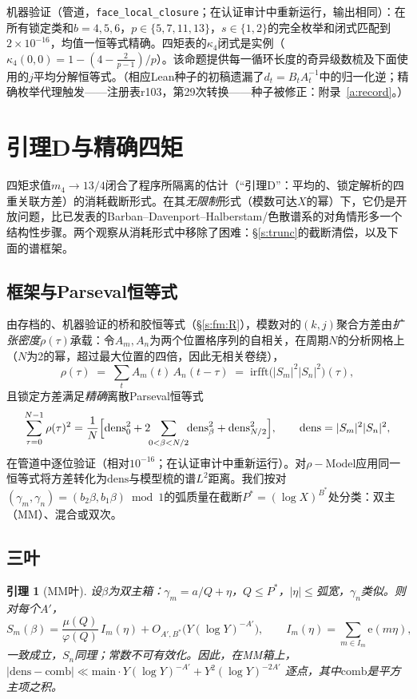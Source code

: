 \documentclass[11pt]{article}
\numberwithin{equation}{section}
\newtheorem{lemma}[theorem]{引理}
\theoremstyle{definition}
\theoremstyle{remark}
\newcommand{\e}{\mathrm{e}}
\begin{document}
机器验证（管道，\texttt{face\_local\_closure}；在认证审计中重新运行，输出相同）：在所有锁定类和$b=4,5,6$，$p\in\{5,7,11,13\}$，$s\in\{1,2\}$的完全枚举和闭式匹配到$2\times10^{-16}$，均值一恒等式精确。四矩表的$\kappa_4$闭式是实例（$\kappa_4(0,0)=1-(4-\tfrac2{p-1})/p$）。该命题提供每一循环长度的奇异级数梳及下面使用的$j$平均分解恒等式。（相应Lean种子的初稿遗漏了$d_t=B_tA_t^{-1}$中的归一化逆；精确枚举代理触发——注册表r103，第29次转换——种子被修正：附录~\ref{a:record}。）

\section{引理D与精确四矩}\label{s:four}

四矩求值$m_4\to13/4$闭合了程序所隔离的估计（“引理D”：平均的、锁定解析的四重关联方差）的消耗截断形式。在其\emph{无限制}形式（模数可达$X$的幂）下，它仍是开放问题，比已发表的Barban--Davenport--Halberstam/色散谱系的对角情形多一个结构性步骤。两个观察从消耗形式中移除了困难：\S\ref{s:trunc}的截断清偿，以及下面的谱框架。

\subsection{框架与Parseval恒等式}

由存档的、机器验证的桥和胶恒等式（\S\ref{s:fm:R}），模数对的$(k,j)$聚合方差由\emph{扩张密度}$\rho(\tau)$承载：令$A_m,A_n$为两个位置格序列的自相关，在周期$N$的分析网格上（$N$为2的幂，超过最大位置的四倍，因此无相关卷绕），
\[
\rho(\tau)\;=\;\sum_{t}A_m(t)\,A_n(t-\tau)
\;=\;\mathrm{irfft}\bigl(|S_m|^{2}|S_n|^{2}\bigr)(\tau),
\]
且锁定方差满足\emph{精确}离散Parseval恒等式
\begin{equation}\label{e:pars}
\sum_{\tau=0}^{N-1}\rho(\tau)^{2}
=\frac1N\Bigl[\mathrm{dens}_0^{2}
+2\!\!\sum_{0<\beta<N/2}\!\!\mathrm{dens}_\beta^{2}
+\mathrm{dens}_{N/2}^{2}\Bigr],
\qquad \mathrm{dens}=|S_m|^{2}|S_n|^{2},
\end{equation}
在管道中逐位验证（相对$10^{-16}$；在认证审计中重新运行）。对$\rho-\mathrm{Model}$应用同一恒等式将方差转化为$\mathrm{dens}$与模型梳的谱$L^2$距离。我们按对$(\gamma_m,\gamma_n)=(b_2\beta,b_1\beta)\bmod1$的弧质量在截断$P^{*}=(\log X)^{B^{*}}$处分类：双主（MM）、混合或双次。

\subsection{三叶}

\begin{lemma}[MM叶]\label{l:MM}
设$\beta$为双主箱：$\gamma_m=a/Q+\eta$，$Q\le P^{*}$，$|\eta|\le$弧宽，$\gamma_n$类似。则对每个$A'$，
\[
S_m(\beta)=\frac{\mu(Q)}{\varphi(Q)}\,I_m(\eta)
+O_{A',B^{*}}\!\bigl(Y(\log Y)^{-A'}\bigr),
\qquad
I_m(\eta)=\sum_{m\in I_m}\e(m\eta),
\]
一致成立，$S_n$同理；常数不可有效化。因此，在MM箱上，
$\bigl|\mathrm{dens}-\mathrm{comb}\bigr|
\ll\mathrm{main}\cdot Y(\log Y)^{-A'}+Y^{2}(\log Y)^{-2A'}$
逐点，其中$\mathrm{comb}$是平方主项之积。
\end{lemma}
\end{document}
